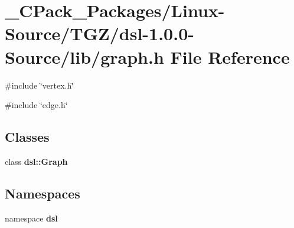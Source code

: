 \section{\_\-CPack\_\-Packages/Linux-\/Source/TGZ/dsl-\/1.0.0-\/Source/lib/graph.h File Reference}
\label{__CPack__Packages_2Linux-Source_2TGZ_2dsl-1_80_80-Source_2lib_2graph_8h}
{\ttfamily \#include \char`\"{}vertex.h\char`\"{}}\par
{\ttfamily \#include \char`\"{}edge.h\char`\"{}}\par
\subsection*{Classes}
\begin{DoxyCompactItemize}
\item 
class {\bf dsl::Graph}
\end{DoxyCompactItemize}
\subsection*{Namespaces}
\begin{DoxyCompactItemize}
\item 
namespace {\bf dsl}
\end{DoxyCompactItemize}
